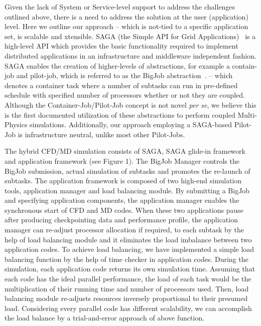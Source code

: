 \documentclass[a4paper]{article}
\begin{document}
Given the lack of System or Service-level support to address the challenges outlined above, there is a need to address the solution at the user (application) level.  Here we outline our approach -- which is not-tied to a specific application set, is scalable and xtensible. SAGA (the Simple API for Grid Applications)~\cite{Jha:2008} is a high-level API which provides the basic functionality required to implement distributed applications in an infrastructure and middleware independent fashion.
SAGA enables the creation of higher-levels of abstractions, for example a contain-job and pilot-job, which is referred to as the BigJob abstraction~\cite{Jha:2009}.
-- which denotes a container task where a number of subtasks can run in pre-defined schedule with specified number of processors whether or not they are coupled.  Although the Container-Job/Pilot-Job concept is not novel {\it per se}, we believe this is the first documented utilization of these abstractions to perform coupled Multi-Physics simulations. Additionally, our approach employing a SAGA-based Pilot-Job is infrastructure neutral, unlike most other Pilot-Jobs.

The hybrid CFD/MD simulation consists of SAGA, SAGA glide-in framework and application framework (see Figure 1).  The BigJob Manager controls the BigJob submission, actual simulation of subtasks and promotes the re-launch of subtasks. The application framework is composed of two high-end simulation tools, application manager and load balancing module. By submitting a BigJob and specifying application components, the application manager enables the synchronous start of CFD and MD codes. When these two applications pause after producing checkpointing data and performance profile, the application manager can re-adjust processor allocation if required, to each subtask by the help of load balancing module and it eliminates the load imbalance between two application codes.  To achieve load balancing, we have implemented a simple load balancing function by the help of time checker in application codes. During the simulation, each application code returns its own simulation time. Assuming that each code has the ideal parallel performance, the load of each task would be the multiplication of their running time and number of processors used. Then, load balancing module re-adjusts resources inversely proportional to their presumed load. Considering every parallel code has different scalability, we can accomplish the load balance by a trial-and-error approach of above function.
\end{document}
